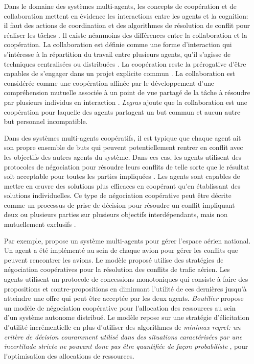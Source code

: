 		Dans le domaine des systèmes multi-agents, les concepts de coopération et de collaboration mettent en évidence les interactions entre les agents et la cognition: il faut des actions de coordination et des algorithmes de résolution de conflit pour réaliser les tâches \cite{jennings1995controlling}. Il existe néanmoins des différences entre la collaboration et la coopération.
		La collaboration est définie comme une forme d'interaction qui s'intéresse à la répartition du travail entre plusieurs agents, qu'il s'agisse de techniques centralisées ou distribuées \cite{ferber1997systemes}. La coopération reste la prérogative d'être capables de s'engager dans un projet explicite commun \cite{lucien2016multiagent}.
		La collaboration est considérée comme une coopération affinée par le développement d'une compréhension mutuelle associée à un point de vue partagé de la tâche à résoudre par plusieurs individus en interaction \cite{weiss1999multiagent,blanquet2007web}. \emph{Legras} \cite{legrascooperation} ajoute que la collaboration est une coopération pour laquelle des agents partagent un but commun et aucun autre but personnel incompatible. 
		
		Dans des systèmes multi-agents coopératifs, il est typique que chaque agent ait son propre ensemble de buts qui peuvent potentiellement rentrer en conflit avec les objectifs des autres agents du système.
		 Dans ces cas, les agents utilisent des protocoles de négociation pour résoudre leurs conflits de telle sorte que le résultat soit acceptable pour toutes les parties impliquées \cite{wollkind2004automated}. Les agents sont capables de mettre en œuvre des solutions plus efficaces en coopérant qu'en établissant des solutions individuelles. Ce type de négociation coopérative peut être décrite comme un processus de prise de décision pour résoudre un conflit impliquant deux ou plusieurs parties sur plusieurs objectifs interdépendants, mais non mutuellement exclusifs \cite{lewicki2011essentials}. 
	
		Par exemple, \cite{wollkind2004automated} propose un système multi-agents pour gérer l'espace aérien national. Un agent a été implémenté au sein de chaque avion pour gérer les conflits que peuvent rencontrer les avions. Le modèle proposé utilise des stratégies de négociation coopératives pour la résolution des conflits de trafic aérien. Les agents utilisent un protocole de concessions monotoniques \cite{zlotkin1989negotiation} qui consiste à faire des propositions et contre-propositions en diminuant l'utilité de ces dernières jusqu'à atteindre une offre qui peut être acceptée par les deux agents. 
		 \emph{Boutilier} \cite{boutilier2002cooperative} propose un modèle de négociation coopérative pour l'allocation des ressources au sein d'un système autonome distribué. Le modèle repose sur une stratégie d'élicitation d'utilité incrémentielle en plus d'utiliser des algorithmes de \textit{minimax regret: un critère de décision couramment utilisé dans des situations caractérisées par une incertitude stricte ne pouvant donc pas être quantifiée de façon probabiliste} \cite{borodin2005online}, pour l'optimisation des allocations de ressources.   
	
